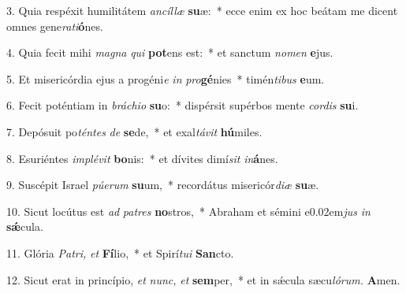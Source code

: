 \item 3. Quia respéxit humilitátem \textit{ancíllæ} \textbf{su}æ:~* ecce enim ex hoc beátam me dicent omnes gene\textit{rati}\textbf{ó}nes.

\item 4. Quia fecit mihi \textit{magna} \textit{qui} \textbf{pot}ens est:~* et sanctum \textit{nomen} \textbf{e}jus.

\item 5. Et misericórdia ejus a progéni\textit{e} \textit{in} \textit{pro}\textbf{gé}nies~* timén\textit{tibus} \textbf{e}um.

\item 6. Fecit poténtiam in \textit{bráchio} \textbf{su}o:~* dispérsit supérbos mente \textit{cordis} \textbf{su}i.

\item 7. Depósuit po\textit{téntes} \textit{de} \textbf{se}de,~* et exal\textit{távit} \textbf{hú}miles.

\item 8. Esuriéntes \textit{implévit} \textbf{bo}nis:~* et dívites dimí\hspace{0.03em}\textit{sit} \textit{in}\textbf{á}nes.

\item 9. Suscépit Israel \textit{púerum} \textbf{su}um,~* recordátus misericór\textit{diæ} \textbf{su}æ.

\item 10. Sicut locútus est \textit{ad} \textit{patres} \textbf{no}stros,~* Abraham et sémini e\kern 0.02em\textit{jus} \textit{in} \textbf{sǽ}cula.

\item 11. Glória \textit{Patri,} \textit{et} \textbf{Fí}lio,~* et Spirí\hspace{0.03em}\textit{tu}\textit{i} \textbf{San}cto.

\item 12. Sicut erat in princípio, \textit{et} \textit{nunc,} \textit{et} \textbf{sem}per,~* et in sǽcula sæcu\hspace{0.03em}\textit{lórum.} \textbf{A}men.